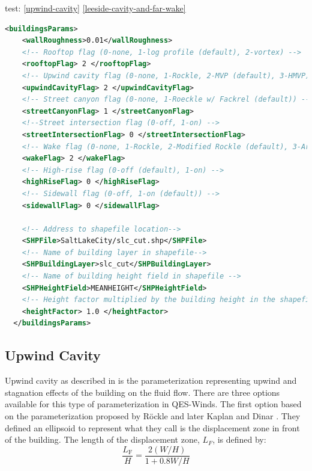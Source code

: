test: \autoref{upwind-cavity} \autoref{leeside-cavity-and-far-wake}

\begin{lstlisting}[language=XML]
<buildingsParams>
    <wallRoughness>0.01</wallRoughness>  
    <!-- Rooftop flag (0-none, 1-log profile (default), 2-vortex) -->
    <rooftopFlag> 2 </rooftopFlag> 
    <!-- Upwind cavity flag (0-none, 1-Rockle, 2-MVP (default), 3-HMVP) -->
    <upwindCavityFlag> 2 </upwindCavityFlag> 	
    <!-- Street canyon flag (0-none, 1-Roeckle w/ Fackrel (default)) -->		
    <streetCanyonFlag> 1 </streetCanyonFlag> 	
    <!--Street intersection flag (0-off, 1-on) -->		
    <streetIntersectionFlag> 0 </streetIntersectionFlag> 
    <!-- Wake flag (0-none, 1-Rockle, 2-Modified Rockle (default), 3-Area Scaled) -->		
    <wakeFlag> 2 </wakeFlag> 					
	<!-- High-rise flag (0-off (default), 1-on) -->
    <highRiseFlag> 0 </highRiseFlag> 
    <!-- Sidewall flag (0-off, 1-on (default)) -->           
    <sidewallFlag> 0 </sidewallFlag> 				
    
    <!-- Address to shapefile location-->
    <SHPFile>SaltLakeCity/slc_cut.shp</SHPFile>	 
    <!-- Name of building layer in shapefile-->                       
    <SHPBuildingLayer>slc_cut</SHPBuildingLayer>     
    <!-- Name of building height field in shapefile -->                     
    <SHPHeightField>MEANHEIGHT</SHPHeightField>      
    <!-- Height factor multiplied by the building height in the shapefile (default = 1.0)-->                    
    <heightFactor> 1.0 </heightFactor>				        
  </buildingsParams>
\end{lstlisting}

\subsection{Upwind Cavity}\label{upwind-cavity}

Upwind cavity as described in \cite{nelson20085,bagal2004improved,gowardhan2010evaluation} is the parameterization representing upwind and stagnation effects of the building on the fluid flow. There are three options available for this type of parameterization in QES-Winds. The first option based on the parameterization proposed by R\"{o}ckle \cite{rockle1990bestimmung} and later Kaplan and Dinar \cite{kaplan1996lagrangian}. They defined an ellipsoid to represent what they call is the displacement zone in front of the building. The length of the displacement zone, $L_F$, is defined by: 
\begin{equation}
\frac{L_{\mathrm{F}}}{H}=\frac{2(W / H)}{1+0.8 W / H}
\label{eq:lf}
\end{equation}

